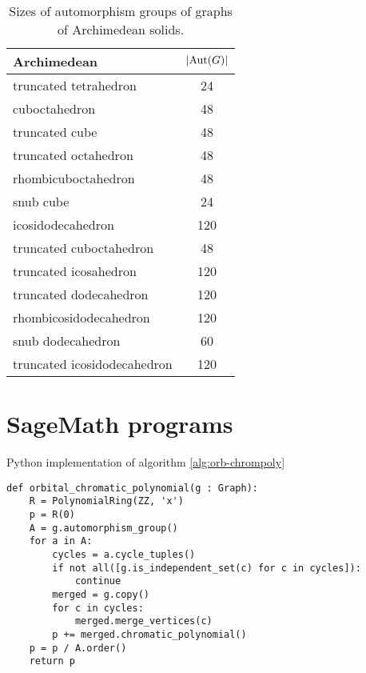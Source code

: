 \begin{table}[H]
\centering
\begin{tabular}{l@{\hspace{1.5cm}}c}
\toprule
\textbf{Archimedean} & \textbf{$\left|{\operatorname{Aut}(G)}\right|$} \\
\midrule
truncated tetrahedron & 24 \\
cuboctahedron & 48 \\
truncated cube & 48 \\
truncated octahedron & 48 \\
rhombicuboctahedron & 48 \\
snub cube & 24 \\
icosidodecahedron & 120 \\
truncated cuboctahedron & 48 \\
truncated icosahedron & 120 \\
truncated dodecahedron & 120 \\
rhombicosidodecahedron & 120 \\
snub dodecahedron & 60 \\
truncated icosidodecahedron & 120 \\
\bottomrule
\end{tabular}
\caption{Sizes of automorphism groups of graphs of Archimedean solids.}
\label{tab:arch-automorphisms}
\end{table}



\section{SageMath programs}

\begin{listing}[H]
\caption{Python implementation of algorithm \ref{alg:orb-chrompoly}}
\begin{lstlisting}
def orbital_chromatic_polynomial(g : Graph):  
    R = PolynomialRing(ZZ, 'x')
    p = R(0)
    A = g.automorphism_group()
    for a in A:
        cycles = a.cycle_tuples()
        if not all([g.is_independent_set(c) for c in cycles]):
            continue
        merged = g.copy()
        for c in cycles:
            merged.merge_vertices(c)
        p += merged.chromatic_polynomial()
    p = p / A.order()
    return p
\end{lstlisting}
\label{prg:orb-chrompoly}
\end{listing}